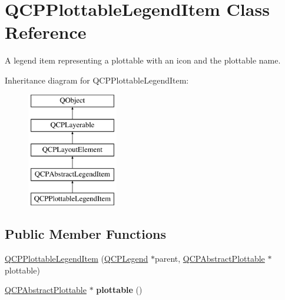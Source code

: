 \hypertarget{class_q_c_p_plottable_legend_item}{}\section{Q\+C\+P\+Plottable\+Legend\+Item Class Reference}
\label{class_q_c_p_plottable_legend_item}


A legend item representing a plottable with an icon and the plottable name.  


Inheritance diagram for Q\+C\+P\+Plottable\+Legend\+Item\+:\begin{figure}[H]
\begin{center}
\leavevmode
\includegraphics[height=5.000000cm]{class_q_c_p_plottable_legend_item}
\end{center}
\end{figure}
\subsection*{Public Member Functions}
\begin{DoxyCompactItemize}
\item 
\hyperlink{class_q_c_p_plottable_legend_item_ac1072591fe409d3dabad51b23ee4d6c5}{Q\+C\+P\+Plottable\+Legend\+Item} (\hyperlink{class_q_c_p_legend}{Q\+C\+P\+Legend} $\ast$parent, \hyperlink{class_q_c_p_abstract_plottable}{Q\+C\+P\+Abstract\+Plottable} $\ast$plottable)
\item 
\hypertarget{class_q_c_p_plottable_legend_item_af29e9a2c60b4cba0cac2447b8af7b488}{}\label{class_q_c_p_plottable_legend_item_af29e9a2c60b4cba0cac2447b8af7b488} 
\hyperlink{class_q_c_p_abstract_plottable}{Q\+C\+P\+Abstract\+Plottable} $\ast$ {\bfseries plottable} ()
\end{DoxyCompactItemize}
